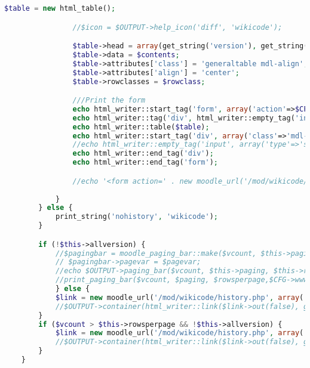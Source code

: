 \begin{lstlisting}[language=PHP]
                $table = new html_table();

                //$icon = $OUTPUT->help_icon('diff', 'wikicode');

                $table->head = array(get_string('version'), get_string('user'), get_string('modified'), '');
                $table->data = $contents;
                $table->attributes['class'] = 'generaltable mdl-align';
				$table->attributes['align'] = 'center';
                $table->rowclasses = $rowclass;

                ///Print the form
				echo html_writer::start_tag('form', array('action'=>$CFG->wwwroot . '/mod/wikicode/diff.php?method=get&id=diff'));
                echo html_writer::tag('div', html_writer::empty_tag('input', array('type'=>'hidden', 'name'=>'pageid', 'value'=>$pageid)));
                echo html_writer::table($table);
                echo html_writer::start_tag('div', array('class'=>'mdl-align'));
                //echo html_writer::empty_tag('input', array('type'=>'submit', 'class'=>'wikicode_form-button', 'value'=>get_string('comparesel', 'wikicode')));
                echo html_writer::end_tag('div');
                echo html_writer::end_tag('form');

				//echo '<form action=' . new moodle_url('/mod/wikicode/diff.php') . ' id="diff" method="get">';
				
            }
        } else {
            print_string('nohistory', 'wikicode');
        }

        if (!$this->allversion) {
            //$pagingbar = moodle_paging_bar::make($vcount, $this->paging, $this->rowsperpage, $CFG->wwwroot.'/mod/wikicode/history.php?pageid='.$pageid.'&amp;');
            // $pagingbar->pagevar = $pagevar;
            //echo $OUTPUT->paging_bar($vcount, $this->paging, $this->rowsperpage, $CFG->wwwroot . '/mod/wikicode/history.php?pageid=' . $pageid . '&amp;');
            //print_paging_bar($vcount, $paging, $rowsperpage,$CFG->wwwroot.'/mod/wikicode/history.php?pageid='.$pageid.'&amp;','paging');
            } else {
            $link = new moodle_url('/mod/wikicode/history.php', array('pageid' => $pageid));
            //$OUTPUT->container(html_writer::link($link->out(false), get_string('viewperpage', 'wikicode', $this->rowsperpage)), 'mdl-align');
        }
        if ($vcount > $this->rowsperpage && !$this->allversion) {
            $link = new moodle_url('/mod/wikicode/history.php', array('pageid' => $pageid, 'allversion' => 1));
            //$OUTPUT->container(html_writer::link($link->out(false), get_string('viewallhistory', 'wikicode')), 'mdl-align');
        }
    }


\end{lstlisting}
